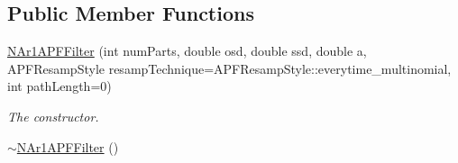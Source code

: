 \subsection*{Public Member Functions}
\begin{DoxyCompactItemize}
\item 
\hyperlink{classNAr1APFFilter_aa13a3fea25c159bb9939726288062809}{N\+Ar1\+A\+P\+F\+Filter} (int num\+Parts, double osd, double ssd, double a, A\+P\+F\+Resamp\+Style resamp\+Technique=A\+P\+F\+Resamp\+Style\+::everytime\+\_\+multinomial, int path\+Length=0)
\begin{DoxyCompactList}\small\item\em The constructor. \end{DoxyCompactList}\item 
\hyperlink{classNAr1APFFilter_ace56d42e3c625ded273809f9e8cb6d3f}{$\sim$\+N\+Ar1\+A\+P\+F\+Filter} ()\hypertarget{classNAr1APFFilter_ace56d42e3c625ded273809f9e8cb6d3f}{}\label{classNAr1APFFilter_ace56d42e3c625ded273809f9e8cb6d3f}


\end{DoxyCompactItemize}
